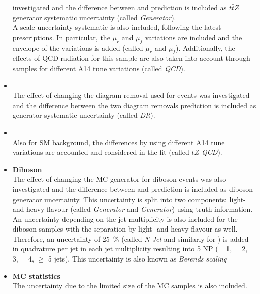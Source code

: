 \begin{itemize}
	investigated and the difference between \aMCatNLO and \Sherpa
	prediction is included as $t\bar{t}Z$ generator systematic
	uncertainty (called \textit{\ttZ Generator}). \\
	A scale uncertainty systematic is also included, following the
	latest prescriptions. In particular, the $\mu_r$ and $\mu_f$
	variations are included and the envelope of the variations is added 
	(called \textit{\ttZ $\mu_r$} and \textit{$\mu_f$}).
	Additionally, the effects of QCD radiation for this
	sample are also taken into account through samples for different A14
	tune variations (called \textit{\ttZ QCD}).\\
	\item \textbf{\tWZ} \\
	The effect of changing the diagram removal used for \tWZ events was
	investigated and the difference between the two diagram removals
	prediction is included as \tWZ generator systematic uncertainty
	(called \textit{\tWZ DR}).\\
	\item \textbf{\tZq} \\
	Also for SM \tZq background, the differences by using different A14
	tune variations are accounted and considered in the fit (called
	\textit{$tZ$ QCD}).\\
	\item \textbf{Diboson} \\
	The effect of changing the MC generator for diboson events was also
	investigated and the difference between \Sherpa and \PowhegBox
	prediction is included as diboson generator uncertainty. This
	uncertainty is split into two components: light- and heavy-flavour
	(called \textit{\VVLF Generator} and \textit{\VVHF Generator}) using truth information. \\
	An uncertainty depending on the jet multiplicity is also included for
	the diboson samples with the separation by light- and heavy-flavour as
	well. Therefore, an uncertainty of \SI{25}{\%} 
	(called \textit{\VVLF N Jet} and similarly for \VVHF) is added in quadrature
	per jet in each jet multiplicity resulting into 
	5 NP (= 1, = 2, = 3, = 4, $\geq$ 5 jets). This uncertainty is also known as \textit{Berends scaling} \\ 
	\item \textbf{MC statistics} \\ 
	The uncertainty due to the limited size of the MC samples is also included.
\end{itemize}

